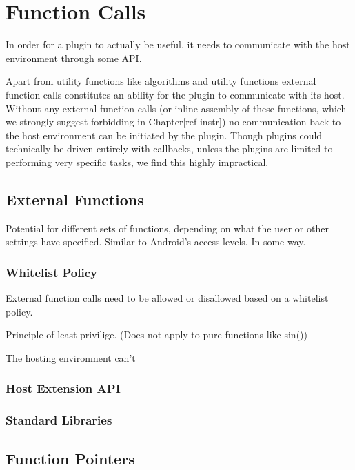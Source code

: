 \chapter {Function Calls}

In order for a plugin to actually be useful, it needs to communicate with
the host environment through some API.

Apart from utility functions like algorithms and utility functions external
function calls constitutes an ability for the plugin to communicate with its
host. Without any external function calls (or inline assembly of these
functions, which we strongly suggest forbidding in Chapter[ref-instr]) no
communication back to the host environment can be initiated by the plugin.
Though plugins could technically be driven entirely with callbacks, unless the
plugins are limited to performing very specific tasks, we find this highly
impractical.


\section {External Functions}

Potential for different sets of functions, depending on what the user or other
settings have specified. Similar to Android's access levels. In some way.

\subsection {Whitelist Policy}

External function calls need to be allowed or disallowed based on a whitelist
policy.

Principle of least privilige. (Does not apply to pure functions like sin())

The hosting environment can't 

\subsection {Host Extension API}

\subsection {Standard Libraries}


\section {Function Pointers}


